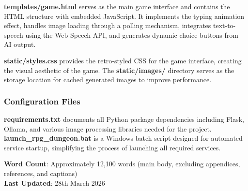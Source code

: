 \documentclass[12pt,a4paper]{article}
\begin{document}
    \textbf{templates/game.html} serves as the main game interface and contains the HTML structure with embedded JavaScript. It implements the typing animation effect, handles image loading through a polling mechanism, integrates text-to-speech using the Web Speech API, and generates dynamic choice buttons from AI output.

    \textbf{static/styles.css} provides the retro-styled CSS for the game interface, creating the visual aesthetic of the game. The \textbf{static/images/} directory serves as the storage location for cached generated images to improve performance.

    \subsubsection*{Configuration Files}

    \textbf{requirements.txt} documents all Python package dependencies including Flask, Ollama, and various image processing libraries needed for the project. \textbf{launch\_rpg\_dungeon.bat} is a Windows batch script designed for automated service startup, simplifying the process of launching all required services.

    \vspace*{\fill}
\noindent\textbf{Word Count}: Approximately 12,100 words (main body, excluding appendices, references, and captions)\\
\textbf{Last Updated}: 28th March 2026

    
\end{document}
